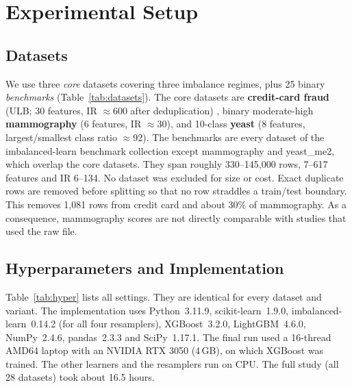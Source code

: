 \documentclass[11pt,a4paper]{article}
\begin{document}
\section{Experimental Setup}\label{sec:setup}

\subsection{Datasets}

We use three \emph{core} datasets covering three imbalance regimes, plus 25 binary \emph{benchmarks} (Table~\ref{tab:datasets}). The core datasets are \textbf{credit-card fraud} (ULB; 30 features, IR $\approx$600 after deduplication) \cite{dalpozzolo2015calibrating}, binary moderate-high \textbf{mammography} (6 features, IR $\approx$30), and 10-class \textbf{yeast} (8 features, largest/smallest class ratio $\approx$92). The benchmarks are every dataset of the imbalanced-learn benchmark collection \cite{lemaitre2017imbalanced} except mammography and yeast\_me2, which overlap the core datasets. They span roughly 330--145{,}000 rows, 7--617 features and IR 6--134. No dataset was excluded for size or cost. Exact duplicate rows are removed before splitting so that no row straddles a train/test boundary. This removes 1{,}081 rows from credit card and about 30\% of mammography. As a consequence, mammography scores are not directly comparable with studies that used the raw file.

{\small

}

\subsection{Hyperparameters and Implementation}

Table~\ref{tab:hyper} lists all settings. They are identical for every dataset and variant. The implementation uses Python~3.11.9, scikit-learn~1.9.0, imbalanced-learn~0.14.2 \cite{lemaitre2017imbalanced} (for all four resamplers), XGBoost~3.2.0, LightGBM~4.6.0, NumPy~2.4.6, pandas~2.3.3 and SciPy~1.17.1. The final run used a 16-thread AMD64 laptop with an NVIDIA RTX 3050 (4\,GB), on which XGBoost was trained. The other learners and the resamplers run on CPU. The full study (all 28 datasets) took about 16.5 hours.
\end{document}

